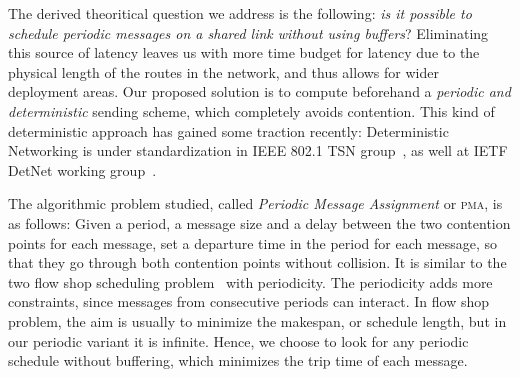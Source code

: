 \documentclass[a4paper,UKenglish,cleveref, autoref, thm-restate]{lipics-v2019}
\newcommand\pma{\textsc{pma}\xspace}
\begin{document}

The derived theoritical question we address is the following: \emph{is it possible to schedule periodic messages on a shared link without using buffers}? Eliminating this source of latency leaves us with more time budget for latency due to the physical length of the routes in the network, and thus allows for wider deployment areas. Our proposed solution is to compute beforehand a \emph{periodic and deterministic} sending scheme, which completely avoids contention. This kind of deterministic approach has gained some traction recently: Deterministic Networking is under standardization in IEEE 802.1 TSN group~\cite{finn-detnet-architecture-08}, as well at IETF DetNet working group~\cite{ieee802}. 

The algorithmic problem studied, called \emph{Periodic Message Assignment} or \pma, is as follows:
Given a period, a message size and a delay between the two contention points for each message, set a departure time in the period for each message, so that they go through both contention points without collision. It is similar to the two flow shop scheduling problem~\cite{yu2004minimizing} with periodicity. The periodicity adds more constraints, since messages from consecutive periods can interact. In flow shop problem, the aim is usually to minimize the makespan, or schedule length, but in our periodic variant it is infinite. Hence, we choose to look for any periodic schedule without buffering, which minimizes the trip time of each message. 
\end{document}
